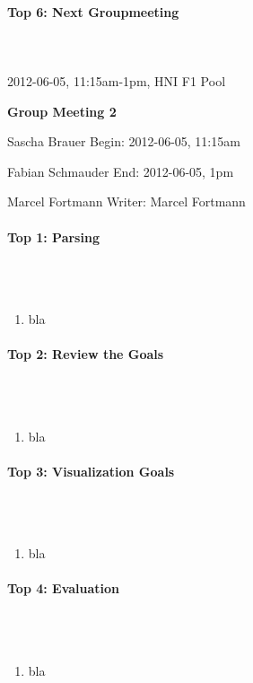 \documentclass{scrartcl}
\begin{document}
\paragraph{Top 6: Next Groupmeeting}
\hfill \\ \hfill \\
2012-06-05, 11:15am-1pm, HNI F1 Pool

\clearpage

\begin{center}
{\huge \textbf{Group Meeting 2}}\\
\end{center}
\begin{description}
\item Sascha Brauer \hfill Begin: 2012-06-05, 11:15am 
\item Fabian Schmauder \hfill End: 2012-06-05, 1pm
\item Marcel Fortmann \hfill Writer: Marcel Fortmann
\end{description}

\paragraph{Top 1: Parsing}
\hfill \\ \hfill \\
\begin {enumerate}
\item bla
\end {enumerate}

\paragraph{Top 2: Review the Goals}
\hfill \\ \hfill \\
\begin {enumerate}
\item bla
\end {enumerate}

\paragraph{Top 3: Visualization Goals}
\hfill \\ \hfill \\
\begin {enumerate}
\item bla
\end {enumerate}

\paragraph{Top 4: Evaluation}
\hfill \\ \hfill \\
\begin {enumerate}
\item bla
\end {enumerate}
\end{document}

